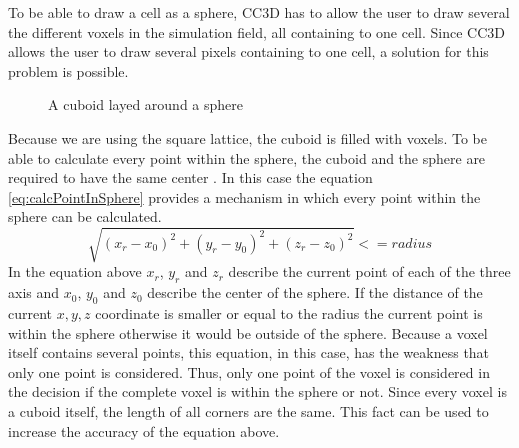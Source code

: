 To be able to draw a cell as a sphere, \ac{CC3D} has to allow the user to draw several the different voxels in the simulation field, all containing to one cell. Since \ac{CC3D} allows the user to draw several pixels containing to one cell, a solution for this problem is possible.


\begin{figure}
\begin{center}
\caption{A cuboid layed around a sphere}
\label{tikz:SphereInCube}
\end{center}
\end{figure}


Because we are using the square lattice, the cuboid is filled with voxels. To be able to calculate every point within the sphere, the cuboid and the sphere are required to have the same center \cite{REF}. In this case the equation \ref{eq:calcPointInSphere} provides a mechanism in which every point within the sphere can be calculated.
\begin{equation}\label{eq:calcPointInSphere}
\sqrt{(x_{r}-x_{0})^2 + (y_{r}-y_{0})^2 + (z_{r}-z_{0})^2} <= radius
\end{equation}
In the equation above $x_{r}$, $y_{r}$ and $z_{r}$ describe the current point of each of the three axis and $x_{0}$, $y_{0}$ and $z_{0}$ describe the center of the sphere. If the distance of the current $x, y, z$ coordinate is smaller or equal to the radius the current point is within the sphere otherwise it would be outside of the sphere.
Because a voxel itself contains several points, this equation, in this case, has the weakness that only one point is considered. Thus, only one point of the voxel is considered in the decision if the complete voxel is within the sphere or not. Since every voxel is a cuboid itself, the length of all corners are the same. This fact can be used to increase the accuracy  of the equation above.

